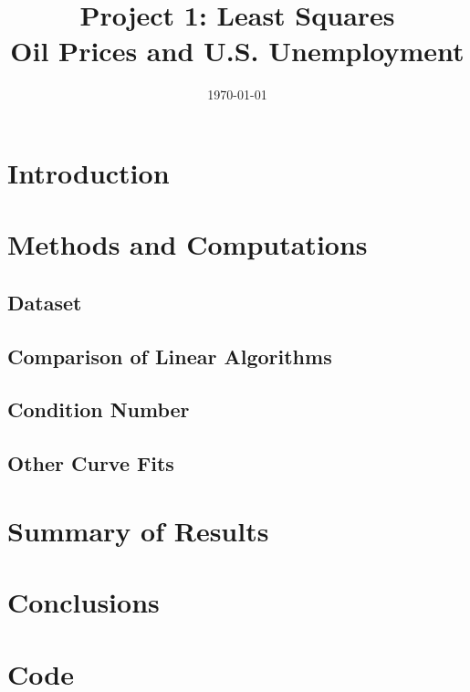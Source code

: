 \documentclass[11pt]{article}
\title{Project 1: Least Squares \\ \large Oil Prices and U.S. Unemployment}
\author{} %
\date{\today}
\begin{document}
\maketitle

\begin{abstract}
\end{abstract}

\section{Introduction}

\section{Methods and Computations}

\subsection{Dataset}

\subsection{Comparison of Linear Algorithms}

\subsection{Condition Number}

\subsection{Other Curve Fits}

\section{Summary of Results}

\section{Conclusions}

\appendix
\section{Code}
% 
\end{document}
